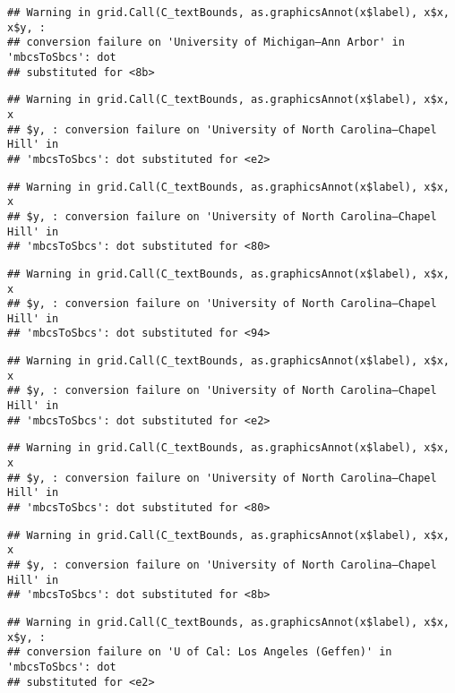 \documentclass[]{article}
\begin{document}
\begin{verbatim}
## Warning in grid.Call(C_textBounds, as.graphicsAnnot(x$label), x$x, x$y, :
## conversion failure on 'University of Michigan—​Ann Arbor' in 'mbcsToSbcs': dot
## substituted for <8b>
\end{verbatim}

\begin{verbatim}
## Warning in grid.Call(C_textBounds, as.graphicsAnnot(x$label), x$x, x
## $y, : conversion failure on 'University of North Carolina—​Chapel Hill' in
## 'mbcsToSbcs': dot substituted for <e2>
\end{verbatim}

\begin{verbatim}
## Warning in grid.Call(C_textBounds, as.graphicsAnnot(x$label), x$x, x
## $y, : conversion failure on 'University of North Carolina—​Chapel Hill' in
## 'mbcsToSbcs': dot substituted for <80>
\end{verbatim}

\begin{verbatim}
## Warning in grid.Call(C_textBounds, as.graphicsAnnot(x$label), x$x, x
## $y, : conversion failure on 'University of North Carolina—​Chapel Hill' in
## 'mbcsToSbcs': dot substituted for <94>
\end{verbatim}

\begin{verbatim}
## Warning in grid.Call(C_textBounds, as.graphicsAnnot(x$label), x$x, x
## $y, : conversion failure on 'University of North Carolina—​Chapel Hill' in
## 'mbcsToSbcs': dot substituted for <e2>
\end{verbatim}

\begin{verbatim}
## Warning in grid.Call(C_textBounds, as.graphicsAnnot(x$label), x$x, x
## $y, : conversion failure on 'University of North Carolina—​Chapel Hill' in
## 'mbcsToSbcs': dot substituted for <80>
\end{verbatim}

\begin{verbatim}
## Warning in grid.Call(C_textBounds, as.graphicsAnnot(x$label), x$x, x
## $y, : conversion failure on 'University of North Carolina—​Chapel Hill' in
## 'mbcsToSbcs': dot substituted for <8b>
\end{verbatim}

\begin{verbatim}
## Warning in grid.Call(C_textBounds, as.graphicsAnnot(x$label), x$x, x$y, :
## conversion failure on 'U of Cal: ​Los Angeles (Geffen)' in 'mbcsToSbcs': dot
## substituted for <e2>
\end{verbatim}
\end{document}
